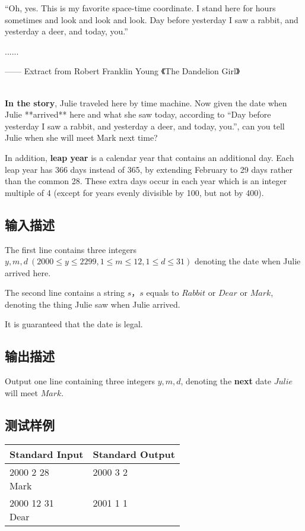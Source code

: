 ``Oh, yes. This is my favorite space-time coordinate. I stand here for hours sometimes and look and look and look. Day before yesterday I saw a rabbit, and yesterday a deer, and today, you.''

......

{\hfill —— Extract from Robert Franklin Young 《The Dandelion Girl》}

~\\

\textbf{In the story}, Julie traveled here by time machine. Now given the date when Julie **arrived** here and what she saw today, according to ``Day before yesterday I saw a rabbit, and yesterday a deer, and today, you.'', can you tell Julie when she will meet Mark next time?

In addition, \textbf{leap year} is a calendar year that contains an additional day. Each leap year has 366 days instead of 365, by extending February to 29 days rather than the common 28. These extra days occur in each year which is an integer multiple of 4 (except for years evenly divisible by 100, but not by 400). 
\subsection*{输入描述}

The first line contains three integers $y, m, d \ (2000 \le y \le 2299, 1 \le m \le 12, 1 \le d \le 31)$ denoting the date when Julie arrived here.

The second line contains a string $s$，$s$ equals to $Rabbit$ or $Dear$ or $Mark$, denoting the thing Julie saw when Julie arrived.

It is guaranteed that the date is legal.

\subsection*{输出描述}

Output one line containing three integers $y, m, d$, denoting the \textbf{next} date $Julie$ will meet $Mark$.

\subsection*{测试样例}

\begin{table}[H]
\begin{tabularx}{\textwidth}{|X|X|}
    \hline
    \textbf{Standard Input} & \textbf{Standard Output} \\ 
    \hline
    \tablecell{
        2000 2 28 \\
        Mark \\
    } & \tablecell{
        2000 3 2 \\ \\
    } \\ 
    \hline
    \tablecell{
        2000 12 31 \\
        Dear    \\
    } & \tablecell{
        2001 1 1 \\ \\
    } \\
    \hline
\end{tabularx}
\end{table}
